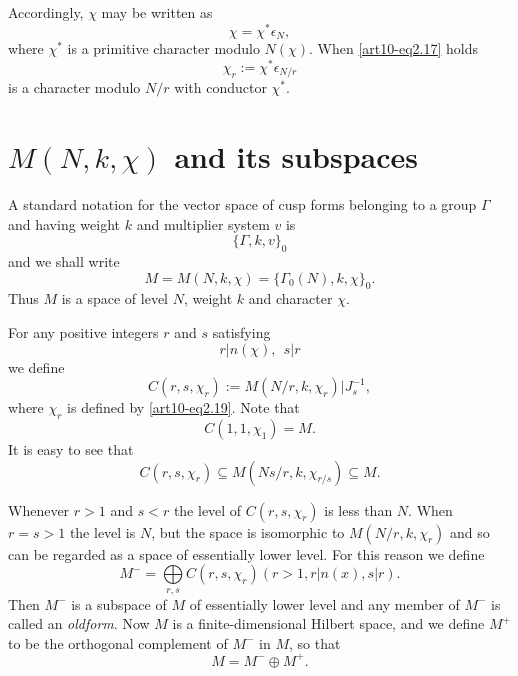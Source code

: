 Accordingly, $\chi$ may be written as
\begin{equation}
\chi = \chi^{*}\epsilon_{N},\label{art10-eq2.18}
\end{equation}
where $\chi^{*}$ is a primitive character modulo $N(\chi)$. When \eqref{art10-eq2.17} holds 
\begin{equation}
\chi_{r} := \chi^{*}\epsilon_{N/r}\label{art10-eq2.19}
\end{equation}
is a character modulo $N/r$ with conductor $\chi^{*}$.

\section{\texorpdfstring{$M(N,k,\chi)$}{Mn} and its subspaces}\label{art10-sec3}
A standard notation for the vector space of cusp forms belonging to a group $\Gamma$ and having weight $k$ and multiplier system $v$ is
\setcounter{equation}{0}
\begin{equation}
\{\Gamma, k, v\}_{0}\label{art10-eq3.1}
\end{equation}
and we shall write
\begin{equation}
M=M(N,k,\chi)=\{\Gamma_{0}(N),k,\chi\}_{0}.\label{art10-eq3.2}
\end{equation}
Thus $M$ is a space of level $N$, weight $k$ and character $\chi$.

For any positive integers $r$ and $s$ satisfying
\begin{equation}
r|n(\chi), \ \ s|r\label{art10-eq3.3}
\end{equation}
we define
\begin{equation}
C(r,s,\chi_{r}):= M(N/r,k,\chi_{r})|J^{-1}_{s},\label{art10-eq3.4}
\end{equation}
where $\chi_{r}$ is defined by \eqref{art10-eq2.19}. Note that
\begin{equation}
C(1,1,\chi_{1})=M.\label{art10-eq3.5}
\end{equation}
It is easy to see that
\begin{equation}
C(r,s,\chi_{r})\subseteq M(Ns/r,k,\chi_{r/s})\subseteq M.\label{art10-eq3.6}
\end{equation}

Whenever $r>1$ and $s<r$ the level of $C(r,s,\chi_{r})$ is less than $N$. When $r=s>1$ the level is $N$, but the space is isomorphic to $M(N/r,k,\chi_{r})$ and so can be regarded as a space of essentially lower level. For this reason we define
\begin{equation}
M^{-}=\bigoplus\limits_{r,s}C(r,s,\chi_{r})(r>1, r|n(x),s|r).\label{art10-eq3.7}
\end{equation}
Then $M^{-}$ is a subspace of $M$ of essentially lower level and any member of $M^{-}$ is called an {\em oldform}. Now $M$ is a finite-dimensional Hilbert space, and we define $M^{+}$ to be the orthogonal complement of $M^{-}$ in $M$, so that
\begin{equation}
M=M^{-}\oplus M^{+}.\label{art10-eq3.8}
\end{equation}

